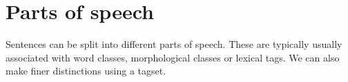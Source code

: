 \documentclass[Report.tex]{subfiles}
\begin{document}
\section{Parts of speech}
Sentences can be split into different parts of speech. These are
typically usually associated with word classes, morphological classes
or lexical tags. We can also make finer distinctions using a tagset.
\end{document}

